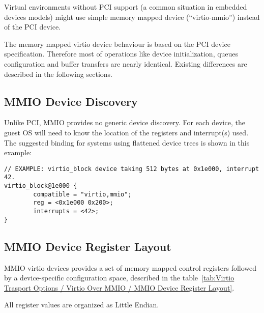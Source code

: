 Virtual environments without PCI support (a common situation in
embedded devices models) might use simple memory mapped device
(``virtio-mmio'') instead of the PCI device.

The memory mapped virtio device behaviour is based on the PCI
device specification. Therefore most of operations like device
initialization, queues configuration and buffer transfers are
nearly identical. Existing differences are described in the
following sections.

\subsection{MMIO Device Discovery}\label{sec:Virtio Transport Options / Virtio Over MMIO / MMIO Device Discovery}

Unlike PCI, MMIO provides no generic device discovery.  For each
device, the guest OS will need to know the location of the registers
and interrupt(s) used.  The suggested binding for systems using
flattened device trees is shown in this example:

\begin{lstlisting}
// EXAMPLE: virtio_block device taking 512 bytes at 0x1e000, interrupt 42.
virtio_block@1e000 {
        compatible = "virtio,mmio";
        reg = <0x1e000 0x200>;
        interrupts = <42>;
}
\end{lstlisting}

\subsection{MMIO Device Register Layout}\label{sec:Virtio Transport Options / Virtio Over MMIO / MMIO Device Register Layout}

MMIO virtio devices provides a set of memory mapped control
registers followed by a device-specific configuration space,
described in the table~\ref{tab:Virtio Trasport Options / Virtio Over MMIO / MMIO Device Register Layout}.

All register values are organized as Little Endian.

\newcommand{\mmioreg}[5]{%
  {\field{#1}} \newline #3 \newline #4 & {\bf#2} \newline #5 \\
}

\newcommand{\mmiodreg}[7]{%
  {\field{#1}} \newline #4 \newline {\field{#2}} \newline #5 \newline #6 & {\bf#3} \newline #7 \\
}


